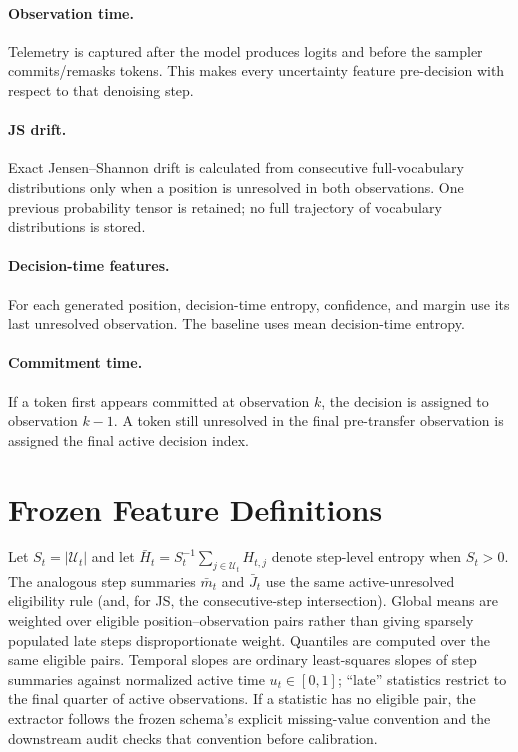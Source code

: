 \paragraph{Observation time.}
Telemetry is captured after the model produces logits and before the sampler commits/remasks tokens.
This makes every uncertainty feature pre-decision with respect to that denoising step.

\paragraph{JS drift.}
Exact Jensen--Shannon drift is calculated from consecutive full-vocabulary distributions only when a position is unresolved in both observations.
One previous probability tensor is retained; no full trajectory of vocabulary distributions is stored.

\paragraph{Decision-time features.}
For each generated position, decision-time entropy, confidence, and margin use its last unresolved observation.
The baseline uses mean decision-time entropy.

\paragraph{Commitment time.}
If a token first appears committed at observation $k$, the decision is assigned to observation $k-1$.
A token still unresolved in the final pre-transfer observation is assigned the final active decision index.

\section{Frozen Feature Definitions}
\label{sec:feature-definitions}

Let $S_t=|\mathcal{U}_t|$ and let
$\bar H_t=S_t^{-1}\sum_{j\in\mathcal{U}_t}H_{t,j}$ denote step-level entropy
when $S_t>0$. The analogous step summaries $\bar m_t$ and $\bar J_t$ use the
same active-unresolved eligibility rule (and, for JS, the consecutive-step
intersection). Global means are weighted over eligible position--observation
pairs rather than giving sparsely populated late steps disproportionate
weight. Quantiles are computed over the same eligible pairs. Temporal slopes
are ordinary least-squares slopes of step summaries against normalized active
time $u_t\in[0,1]$; ``late'' statistics restrict to the final quarter of active
observations. If a statistic has no eligible pair, the extractor follows the
frozen schema's explicit missing-value convention and the downstream audit
checks that convention before calibration.

